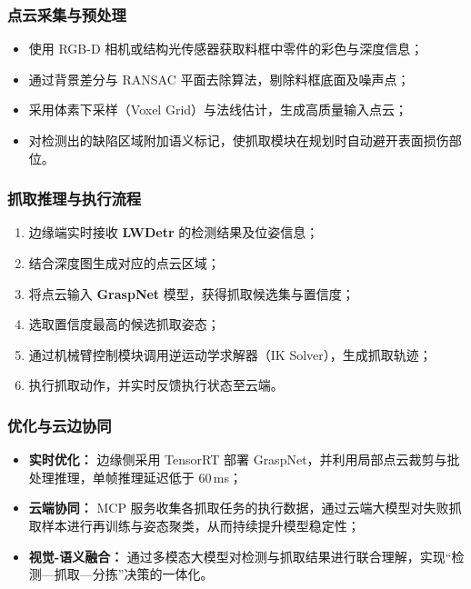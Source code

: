 \documentclass{cumcmthesis}
\begin{document}
\subsubsection{点云采集与预处理}

\begin{itemize}
    \item 使用 RGB-D 相机或结构光传感器获取料框中零件的彩色与深度信息；
    \item 通过背景差分与 RANSAC 平面去除算法，剔除料框底面及噪声点；
    \item 采用体素下采样（Voxel Grid）与法线估计，生成高质量输入点云；
    \item 对检测出的缺陷区域附加语义标记，使抓取模块在规划时自动避开表面损伤部位。
\end{itemize}

\subsubsection{抓取推理与执行流程}

\begin{enumerate}
    \item 边缘端实时接收 \textbf{LWDetr} 的检测结果及位姿信息；
    \item 结合深度图生成对应的点云区域；
    \item 将点云输入 \textbf{GraspNet} 模型，获得抓取候选集与置信度；
    \item 选取置信度最高的候选抓取姿态；
    \item 通过机械臂控制模块调用逆运动学求解器（IK Solver），生成抓取轨迹；
    \item 执行抓取动作，并实时反馈执行状态至云端。
\end{enumerate}

\subsubsection{优化与云边协同}

\begin{itemize}
    \item \textbf{实时优化：} 边缘侧采用 TensorRT 部署 GraspNet，并利用局部点云裁剪与批处理推理，单帧推理延迟低于 60\,ms；
    \item \textbf{云端协同：} MCP 服务收集各抓取任务的执行数据，通过云端大模型对失败抓取样本进行再训练与姿态聚类，从而持续提升模型稳定性；
    \item \textbf{视觉-语义融合：} 通过多模态大模型对检测与抓取结果进行联合理解，实现“检测—抓取—分拣”决策的一体化。
\end{itemize}
\end{document}
